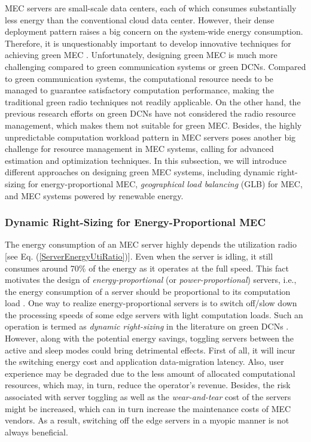 \documentclass[journal]{IEEEtran}
\begin{document}
{MEC servers are small-scale data centers, each of which consumes substantially less energy than the conventional cloud data center. However, their dense deployment pattern raises a big concern on the system-wide energy consumption. Therefore, it is unquestionably important to develop innovative techniques for achieving green MEC \cite{XJinGreenDCSurvey16,XSunIEEENetw1602}. Unfortunately, designing green MEC is much more challenging compared to green communication systems or green DCNs. Compared to green communication systems, the computational resource needs to be managed to guarantee satisfactory computation performance, making the traditional green radio techniques not readily applicable. On the other hand, the previous research efforts on green DCNs have not considered the radio resource management, which makes them not suitable for green MEC. Besides, the highly unpredictable computation workload pattern in MEC servers poses another big challenge for resource management in MEC systems, calling for advanced estimation and optimization techniques. In this subsection, we will introduce different approaches on designing green MEC systems, including dynamic right-sizing for energy-proportional MEC, \emph{geographical load balancing} (GLB) for MEC, and MEC systems powered by renewable energy.

\subsubsection{\textbf{Dynamic Right-Sizing for Energy-Proportional MEC}}

The energy consumption of an MEC server highly depends the utilization radio [see Eq. (\ref{ServerEnergyUtiRatio})]. Even when the server is idling, it still consumes around 70\% of the energy as it operates at the full speed. This fact motivates the  design of \emph{energy-proportional} (or \emph{power-proportional}) servers, i.e., the energy consumption of a server should be proportional to its computation load \cite{Barroso07}. One way to realize energy-proportional servers is to switch off/slow down the processing speeds of some edge servers with light computation loads. Such an operation is termed as \emph{dynamic right-sizing} in the literature on green DCNs \cite{MLin1310}. However, along with the potential energy savings, toggling servers between the active and sleep modes could bring detrimental effects. First of all, it will incur the switching energy cost and application data-migration latency. Also, user experience may be degraded due to the less amount of allocated computational resources, which may, in turn, reduce the operator's revenue. Besides, the risk associated with server toggling as well as the \emph{wear-and-tear} cost of the servers might be increased, which can in turn increase the maintenance costs of MEC vendors. As a result, switching off the edge servers in a myopic manner is not always beneficial.


}
\end{document}
